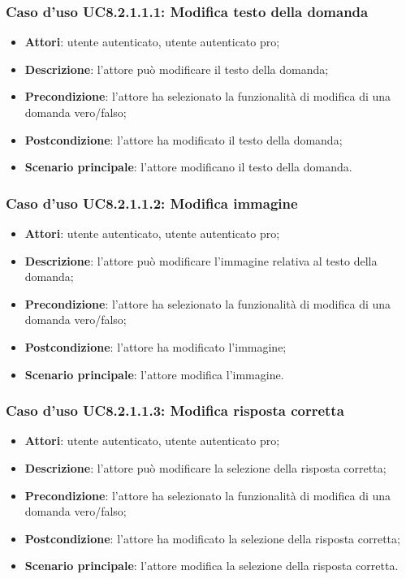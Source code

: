 \subsubsection{Caso d'uso UC8.2.1.1.1: Modifica testo della domanda}
	\begin{itemize}
		\item
			\textbf{Attori}: utente autenticato, utente autenticato pro;
		\item		
			\textbf{Descrizione}: l'attore può modificare il testo della domanda;
		\item
			\textbf{Precondizione}: l'attore ha selezionato la funzionalità di modifica di una domanda vero/falso; 
		\item
			\textbf{Postcondizione}: l'attore ha modificato il testo della domanda;
		\item
			\textbf{Scenario principale}: l'attore modificano il testo della domanda. 		
	\end{itemize}
	
\subsubsection{Caso d'uso UC8.2.1.1.2: Modifica immagine}
	\begin{itemize}
		\item
			\textbf{Attori}: utente autenticato, utente autenticato pro;
		\item		
			\textbf{Descrizione}: l'attore può modificare l'immagine relativa al testo della domanda;
		\item
			\textbf{Precondizione}: l'attore ha selezionato la funzionalità di modifica di una domanda vero/falso; 
		\item
			\textbf{Postcondizione}: l'attore ha modificato l'immagine;
		\item
			\textbf{Scenario principale}: l'attore modifica l'immagine. 	
	\end{itemize}
	
\subsubsection{Caso d'uso UC8.2.1.1.3: Modifica risposta corretta}
	\begin{itemize}
		\item
			\textbf{Attori}: utente autenticato, utente autenticato pro;
		\item		
			\textbf{Descrizione}: l'attore può modificare la selezione della risposta corretta;
		\item
			\textbf{Precondizione}: l'attore ha selezionato la funzionalità di modifica di una domanda vero/falso; 
		\item
			\textbf{Postcondizione}: l'attore ha modificato la selezione della risposta corretta;
		\item
			\textbf{Scenario principale}: l'attore modifica la selezione della risposta corretta. 
	 			
	\end{itemize}
	